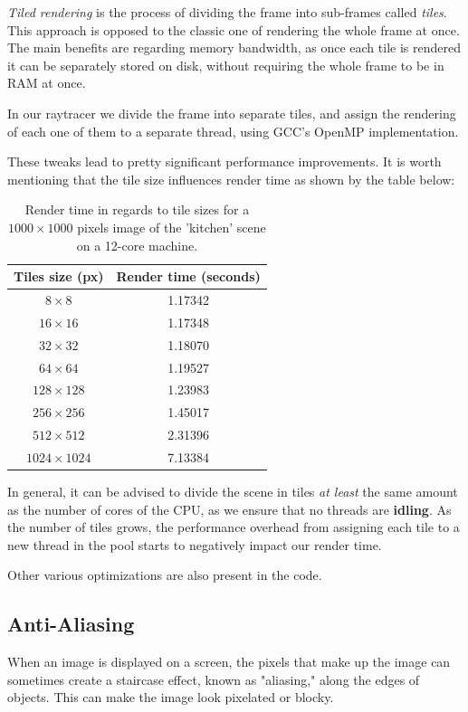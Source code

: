 \documentclass[tikz,14pt,fleqn]{article}
\begin{document}
\textit{Tiled rendering} is the process of dividing the frame into sub-frames called \textit{tiles}. This approach is opposed to the classic one of rendering the whole frame at once. The main benefits are regarding memory bandwidth, as once each tile is rendered it can be separately stored on disk, without requiring the whole frame to be in RAM at once.

In our raytracer we divide the frame into separate tiles, and assign the rendering of each one of them to a separate thread, using GCC's OpenMP implementation.

These tweaks lead to pretty significant performance improvements. It is worth mentioning that the tile size influences render time as shown by the table below:


\begin{table}[h!]
    \centering
    \begin{tabular}{c|c}
        Tiles size (px) & Render time (seconds)\\ \hline
        $8\times 8$ &  1.17342\\
        $16\times 16$ &1.17348\\
        $32\times 32$ &1.18070\\
        $64\times 64$ &1.19527\\
        $128\times 128$ & 1.23983\\
        $256 \times 256$ & 1.45017\\
        $512 \times 512$ & 2.31396\\
        $1024 \times 1024$ & 7.13384
    \end{tabular}
    \caption{Render time in regards to tile sizes for a $1000\times 1000$ pixels image of the 'kitchen' scene on a 12-core machine.}
\end{table}
In general, it can be advised to divide the scene in tiles \textit{at least} the same amount as the number of cores of the CPU, as we ensure that no threads are \textbf{idling}. As the number of tiles grows, the performance overhead from assigning each tile to a new thread in the pool starts to negatively impact our render time.

Other various optimizations are also present in the code.

\subsection{Anti-Aliasing}
When an image is displayed on a screen, the pixels that make up the image can sometimes create a staircase effect, known as "aliasing," along the edges of objects. 
This can make the image look pixelated or blocky.
\end{document}
